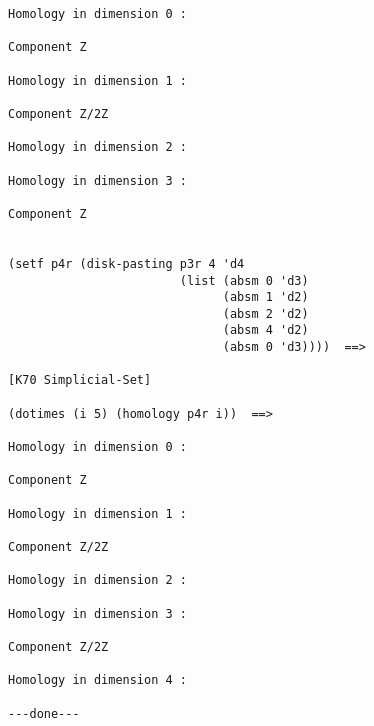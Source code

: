 {\begin{verbatim}
Homology in dimension 0 :

Component Z

Homology in dimension 1 :

Component Z/2Z

Homology in dimension 2 :

Homology in dimension 3 :

Component Z


(setf p4r (disk-pasting p3r 4 'd4
                        (list (absm 0 'd3)
                              (absm 1 'd2)
                              (absm 2 'd2)
                              (absm 4 'd2)
                              (absm 0 'd3))))  ==>

[K70 Simplicial-Set]

(dotimes (i 5) (homology p4r i))  ==>

Homology in dimension 0 :

Component Z

Homology in dimension 1 :

Component Z/2Z

Homology in dimension 2 :

Homology in dimension 3 :

Component Z/2Z

Homology in dimension 4 :

---done---
\end{verbatim}}

